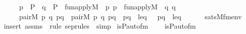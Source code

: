 \begin{isabellebody}
\ \ \ \ \ \ \ \ p\ {\isasymin}\ P\ {\isasymlongrightarrow}\ q\ {\isasymin}\ P\ {\isasymlongrightarrow}\ fun{\isacharunderscore}{\kern0pt}apply{\isacharparenleft}{\kern0pt}{\isacharhash}{\kern0pt}{\isacharhash}{\kern0pt}M{\isacharcomma}{\kern0pt}\ {\isasympi}{\isacharcomma}{\kern0pt}\ p{\isacharcomma}{\kern0pt}\ {\isasympi}p{\isacharparenright}{\kern0pt}\ {\isasymlongrightarrow}\ fun{\isacharunderscore}{\kern0pt}apply{\isacharparenleft}{\kern0pt}{\isacharhash}{\kern0pt}{\isacharhash}{\kern0pt}M{\isacharcomma}{\kern0pt}\ {\isasympi}{\isacharcomma}{\kern0pt}\ q{\isacharcomma}{\kern0pt}\ {\isasympi}q{\isacharparenright}{\kern0pt}\ {\isasymlongrightarrow}\isanewline
\ \ \ \ \ \ \ \ pair{\isacharparenleft}{\kern0pt}{\isacharhash}{\kern0pt}{\isacharhash}{\kern0pt}M{\isacharcomma}{\kern0pt}\ p{\isacharcomma}{\kern0pt}\ q{\isacharcomma}{\kern0pt}\ p{\isacharunderscore}{\kern0pt}q{\isacharparenright}{\kern0pt}\ {\isasymlongrightarrow}\ pair{\isacharparenleft}{\kern0pt}{\isacharhash}{\kern0pt}{\isacharhash}{\kern0pt}M{\isacharcomma}{\kern0pt}\ {\isasympi}p{\isacharcomma}{\kern0pt}\ {\isasympi}q{\isacharcomma}{\kern0pt}\ {\isasympi}p{\isacharunderscore}{\kern0pt}{\isasympi}q{\isacharparenright}{\kern0pt}\ {\isasymlongrightarrow}\ {\isacharparenleft}{\kern0pt}p{\isacharunderscore}{\kern0pt}q\ {\isasymin}\ leq\ \ {\isasymlongleftrightarrow}\ {\isasympi}p{\isacharunderscore}{\kern0pt}{\isasympi}q\ {\isasymin}\ leq{\isacharparenright}{\kern0pt}{\isacharparenright}{\kern0pt}{\isacharparenright}{\kern0pt}\isanewline
\ \ \ \ \ {\isasymlongleftrightarrow}\ sats{\isacharparenleft}{\kern0pt}M{\isacharcomma}{\kern0pt}{\isacharquery}{\kern0pt}fm{\isacharparenleft}{\kern0pt}{}{\isacharcomma}{\kern0pt}{}{\isacharcomma}{\kern0pt}{}{\isacharparenright}{\kern0pt}{\isacharcomma}{\kern0pt}env{\isacharparenright}{\kern0pt}{\isachardoublequoteclose}\isanewline
%
\isadelimproof
\ \ %
\endisadelimproof
%
\isatagproof
{}\isamarkupfalse%
\ {\isacharparenleft}{\kern0pt}insert\ assms\ {\isacharsemicolon}{\kern0pt}\ {\isacharparenleft}{\kern0pt}rule\ sep{\isacharunderscore}{\kern0pt}rules\ {\isacharbar}{\kern0pt}\ simp{\isacharparenright}{\kern0pt}{\isacharplus}{\kern0pt}{\isacharparenright}{\kern0pt}%
\endisatagproof
{\isafoldproof}%
%
\isadelimproof
\isanewline
%
\endisadelimproof
\isanewline
{}\isamarkupfalse%
\ is{\isacharunderscore}{\kern0pt}P{\isacharunderscore}{\kern0pt}auto{\isacharunderscore}{\kern0pt}fm\ \ \isanewline
\ \ {\isachardoublequoteopen}is{\isacharunderscore}{\kern0pt}P{\isacharunderscore}{\kern0pt}auto{\isacharunderscore}{\kern0pt}fm\ {\isasymequiv}\ \ \isanewline

\end{isabellebody}
